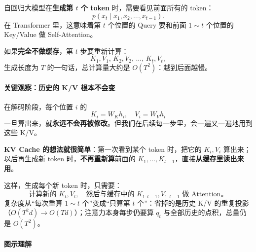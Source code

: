 自回归大模型在\textbf{生成第 $t$ 个 token} 时，需要看见前面所有的 token：
\[
p(x_t \mid x_1, x_2, \dots, x_{t-1}).
\]
在 Transformer 里，这意味着第 $t$ 个位置的 Query 要和前面 $1\sim t$ 个位置的 Key/Value 做 Self-Attention。

如果\textbf{完全不做缓存}，第 $t$ 步要重新计算：
\[
K_1, V_1,\, K_2, V_2,\, \dots,\, K_t, V_t,
\]
生成长度为 $T$ 的一句话，总计算量大约是 $O(T^2)$：越到后面越慢。

\paragraph{关键观察：历史的 K/V 根本不会变}

在解码阶段，每个位置 $i$ 的
\[
K_i = W_K h_i, \quad V_i = W_V h_i
\]
一旦算出来，就\textbf{永远不会再被修改}。但我们在后续每一步里，会一遍又一遍地用到这些 K/V。

\textbf{KV Cache 的想法就很简单}：第一次看到某个 token 时，把它的 $K_i, V_i$ 算出来；以后再生成新 token 时，\textbf{不再重新算}前面的 $K_1,\dots,K_{t-1}$，直接\textbf{从缓存里读出来用}。

这样，生成每个新 token 时，只需要：
\[
\text{计算新的 } K_t, V_t,\quad \text{然后与缓存中的 } K_{1:t-1}, V_{1:t-1} \text{ 做 Attention。}
\]
复杂度从“每次重算 $1\sim t$ 个”变成“只算第 $t$ 个”：省掉的是历史 K/V 的重复投影（$O(T^2 d) \to O(T d)$）；注意力本身每步仍要算 $q_t$ 与全部历史的点积，总量仍是 $O(T^2)$。


\paragraph{图示理解}\mbox{}\par\nopagebreak

